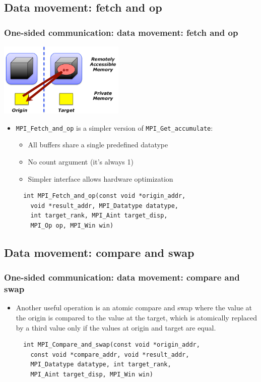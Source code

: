\documentclass{beamer}
\begin{document}
\subsection{Data movement: fetch and op}
\begin{frame}[fragile]
  \frametitle{One-sided communication: data movement: fetch and op }
\includegraphics[width=6.0cm]{graphs/get_accumulate.png}
\begin{itemize}
\item {\color{mycolorcode}\verb|MPI_Fetch_and_op|} is a simpler version of {\color{mycolorcode}\verb|MPI_Get_accumulate|}:
\begin{itemize}
\item All buffers share a single predefined datatype
\item No count argument (it's always 1)
\item Simpler interface allows hardware optimization
\end{itemize}
{\color{mycolorcode}
\begin{verbatim}
  int MPI_Fetch_and_op(const void *origin_addr, 
    void *result_addr, MPI_Datatype datatype, 
    int target_rank, MPI_Aint target_disp,
    MPI_Op op, MPI_Win win)
\end{verbatim}
}
\end{itemize}
\end{frame}

\subsection{Data movement: compare and swap}
\begin{frame}[fragile]
  \frametitle{One-sided communication: data movement: compare and swap }
\begin{itemize}
\item 
Another useful operation is an atomic compare and swap where the value at the origin is
compared to the value at the target, which is atomically replaced by a third value only if
the values at origin and target are equal.
{\color{mycolorcode}
\begin{verbatim}
  int MPI_Compare_and_swap(const void *origin_addr, 
    const void *compare_addr, void *result_addr, 
    MPI_Datatype datatype, int target_rank,
    MPI_Aint target_disp, MPI_Win win)
\end{verbatim}
}
\end{itemize}
\end{frame}
\end{document}
